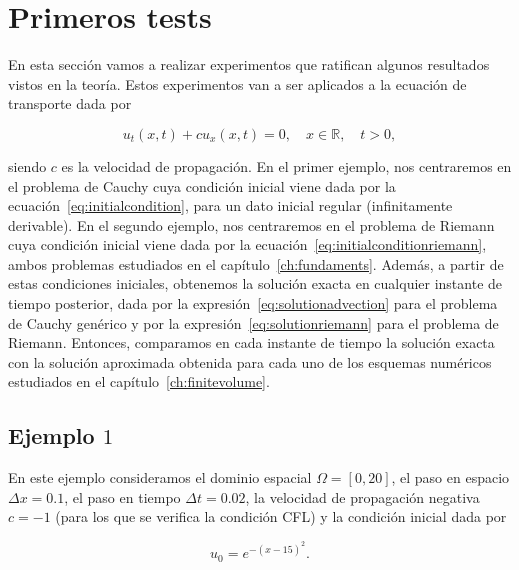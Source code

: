 

\section{Primeros tests}\label{sec:firsttests}

En esta sección vamos a realizar experimentos que ratifican algunos
resultados vistos en la teoría.
Estos experimentos van a ser aplicados a la ecuación de transporte
dada por

\begin{equation}\label{eq:transportequation}
	u_{t}
	\left(x,t\right)+
	cu_{x}
	\left(x,t\right)=
	0,\quad
	x\in\mathbb{R},\quad
	t>0,
\end{equation}

siendo $c$ es la velocidad de propagación.
En el primer ejemplo, nos centraremos en el problema de Cauchy cuya
condición inicial viene dada por la
ecuación~\eqref{eq:initialcondition}, para un dato inicial regular
(infinitamente derivable).
En el segundo ejemplo, nos centraremos en el problema de Riemann cuya
condición inicial viene dada por la
ecuación~\eqref{eq:initialconditionriemann}, ambos problemas
estudiados en el capítulo~\ref{ch:fundaments}.
Además, a partir de estas condiciones iniciales, obtenemos la
solución exacta en cualquier instante de tiempo posterior, dada por
la expresión~\eqref{eq:solutionadvection} para el problema de Cauchy
genérico y por la expresión~\eqref{eq:solutionriemann} para el
problema de Riemann.
Entonces, comparamos en cada instante de tiempo la solución exacta
con la solución aproximada obtenida para cada uno de los esquemas
numéricos estudiados en el capítulo~\ref{ch:finitevolume}.

\subsection*{Ejemplo $1$}

En este ejemplo consideramos el dominio espacial
$\Omega=\left[0,20\right]$, el paso en espacio $\Delta x=0.1$, el
paso en tiempo $\Delta t=0.02$, la velocidad de propagación negativa
$c=-1$ (para los que se verifica la condición CFL) y la condición
inicial dada por

\begin{equation*}
	u_{0}=
	e^{-{\left(x-15\right)}^{2}}.
\end{equation*}

